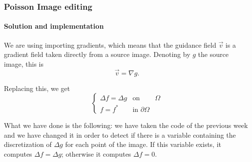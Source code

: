 \documentclass[11pt]{beamer}
\begin{document}
\begin{frame}
\frametitle{Poisson Image editing}
\framesubtitle{Solution and implementation}
We are using importing gradients, which means that the guidance field $\overrightarrow{v}$ is a gradient field taken directly from a source image. Denoting
by $g$ the source image, this is
$$\overrightarrow{v} = \nabla g.$$

Replacing this, we get
\begin{equation*}
\left\{\begin{matrix}
 \Delta f=\Delta g & \text{on } & \Omega\\ 
 f=f^{*}& \text{in }\partial\Omega
\end{matrix}\right.
\end{equation*}

What we have done is the following: we have taken the code of the previous week and we have changed it in order to detect if there is a variable containing the discretization of $\Delta g$ for each point of the image. If this variable exists, it computes $\Delta f = \Delta g$; otherwise it computes $\Delta f = 0$.
\end{frame}
\end{document}
